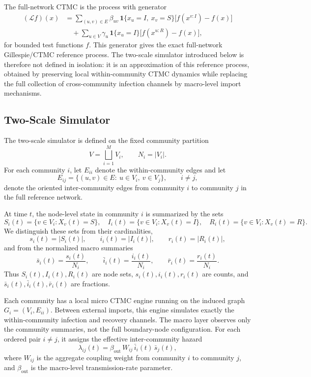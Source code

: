 \documentclass{article}
\begin{document}
The full-network CTMC is the process with generator
\[
\begin{aligned}
(\mathcal L f)(x)
&=
\sum_{(u,v)\in E}
\beta_{uv}\,\mathbf{1}\{x_u=I,\ x_v=S\}
\bigl[f(x^{v:I})-f(x)\bigr]
\\
&\quad+
\sum_{u\in V}
\gamma_u\,\mathbf{1}\{x_u=I\}
\bigl[f(x^{u:R})-f(x)\bigr],
\end{aligned}
\]
for bounded test functions \(f\). This generator gives the exact full-network Gillespie/CTMC reference process. The two-scale simulator introduced below is therefore not defined in isolation: it is an approximation of this reference process, obtained by preserving local within-community CTMC dynamics while replacing the full collection of cross-community infection channels by macro-level import mechanisms.

\subsection{Two-Scale Simulator}
\label{sec:two_scale_simulator}

The two-scale simulator is defined on the fixed community partition
\[
V=\bigsqcup_{i=1}^{M}V_i,
\qquad N_i=|V_i|.
\]
For each community \(i\), let \(E_{ii}\) denote the within-community edges and let
\[
E_{ij}=\{(u,v)\in E:\ u\in V_i,\ v\in V_j\},
\qquad i\neq j,
\]
denote the oriented inter-community edges from community \(i\) to community \(j\) in the full reference network.

At time \(t\), the node-level state in community \(i\) is summarized by the sets
\[
S_i(t)=\{v\in V_i:X_v(t)=S\},\quad
I_i(t)=\{v\in V_i:X_v(t)=I\},\quad
R_i(t)=\{v\in V_i:X_v(t)=R\}.
\]
We distinguish these sets from their cardinalities,
\[
s_i(t)=|S_i(t)|,\qquad i_i(t)=|I_i(t)|,\qquad r_i(t)=|R_i(t)|,
\]
and from the normalized macro summaries
\[
\bar{s}_i(t)=\frac{s_i(t)}{N_i},\qquad
\bar{i}_i(t)=\frac{i_i(t)}{N_i},\qquad
\bar{r}_i(t)=\frac{r_i(t)}{N_i}.
\]
Thus \(S_i(t),I_i(t),R_i(t)\) are node sets, \(s_i(t),i_i(t),r_i(t)\) are counts, and \(\bar{s}_i(t),\bar{i}_i(t),\bar{r}_i(t)\) are fractions.

Each community has a local micro CTMC engine running on the induced graph \(G_i=(V_i,E_{ii})\). Between external imports, this engine simulates exactly the within-community infection and recovery channels. The macro layer observes only the community summaries, not the full boundary-node configuration. For each ordered pair \(i\neq j\), it assigns the effective inter-community hazard
\[
\lambda_{ij}(t)
=\beta_{\mathrm{out}}\,W_{ij}\,\bar{i}_i(t)\,\bar{s}_j(t),
\]
where \(W_{ij}\) is the aggregate coupling weight from community \(i\) to community \(j\), and \(\beta_{\mathrm{out}}\) is the macro-level transmission-rate parameter.
\end{document}
